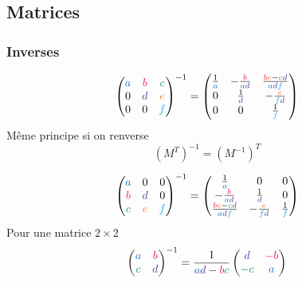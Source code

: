 \documentclass[resume]{subfiles}
\begin{document}
\subsection{Matrices}
\subsubsection{Inverses}
$$\begin{pmatrix}
\textcolor{RoyalBlue}{a} & \textcolor{OrangeRed}{b} & \textcolor{ForestGreen}{c}\\
0 & \textcolor{Violet}{d} & \textcolor{Orange}{e}\\
0 & 0 & \textcolor{ProcessBlue}{f}
\end{pmatrix}^{-1}=\begin{pmatrix}
\frac{1}{\textcolor{RoyalBlue}{a}} & -\frac{\textcolor{OrangeRed}{b}}{\textcolor{RoyalBlue}{a}\textcolor{Violet}{d}} & \frac{\textcolor{OrangeRed}{b}\textcolor{Orange}{e}-\textcolor{ForestGreen}{c}\textcolor{Violet}{d}}{\textcolor{RoyalBlue}{a}\textcolor{Violet}{d}\textcolor{ProcessBlue}{f}}\\
0 & \frac{1}{\textcolor{Violet}{d}} & -\frac{\textcolor{Orange}{e}}{\textcolor{ProcessBlue}{f}\textcolor{Violet}{d}}\\
0 & 0 & \frac{1}{\textcolor{ProcessBlue}{f}}
\end{pmatrix}$$
Même principe si on renverse
$$\left(M^{T}\right)^{-1}=\left(M^{-1}\right)^{T}$$

$$\begin{pmatrix}
\textcolor{RoyalBlue}{a} & 0 & 0\\
\textcolor{OrangeRed}{b} & \textcolor{Violet}{d} & 0\\
\textcolor{ForestGreen}{c} & \textcolor{Orange}{e} & \textcolor{ProcessBlue}{f}
\end{pmatrix}^{-1}=\begin{pmatrix}
\frac{1}{\textcolor{RoyalBlue}{a}} & 0 & 0\\
-\frac{\textcolor{OrangeRed}{b}}{\textcolor{RoyalBlue}{a}\textcolor{Violet}{d}} & \frac{1}{\textcolor{Violet}{d}} & 0\\
\frac{\textcolor{OrangeRed}{b}\textcolor{Orange}{e}-\textcolor{ForestGreen}{c}\textcolor{Violet}{d}}{\textcolor{RoyalBlue}{a}\textcolor{Violet}{d}\textcolor{ProcessBlue}{f}} & -\frac{\textcolor{Orange}{e}}{\textcolor{ProcessBlue}{f}\textcolor{Violet}{d}} &
\frac{1}{\textcolor{ProcessBlue}{f}}
\end{pmatrix}$$
Pour une matrice $2\times 2$
$$\begin{pmatrix}
\textcolor{RoyalBlue}{a} & \textcolor{OrangeRed}{b}\\
\textcolor{ForestGreen}{c} & \textcolor{Violet}{d}
\end{pmatrix}^{-1}=\frac{1}{\textcolor{RoyalBlue}{a}\textcolor{Violet}{d}-\textcolor{OrangeRed}{b}\textcolor{ForestGreen}{c}}\begin{pmatrix}
\textcolor{Violet}{d} & \textcolor{OrangeRed}{-b}\\
\textcolor{ForestGreen}{-c} & \textcolor{RoyalBlue}{a}
\end{pmatrix}$$
\end{document}
